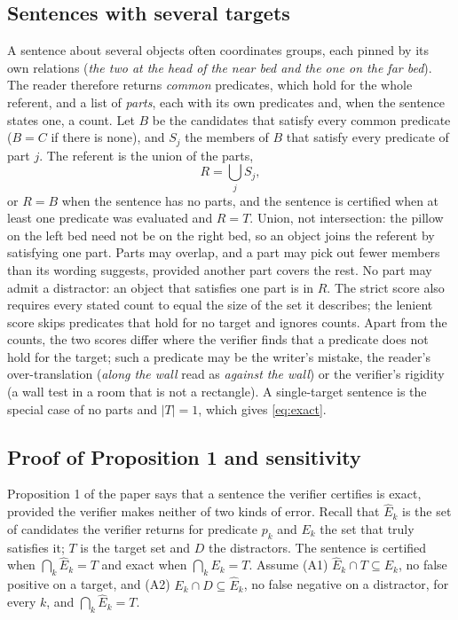 \subsection{Sentences with several targets}
\label{supp:parts}
A sentence about several objects often coordinates groups, each pinned by its own relations (\emph{the two at the head of the near bed and the one on the far bed}).
The reader therefore returns \emph{common} predicates, which hold for the whole referent, and a list of \emph{parts}, each with its own predicates and, when the sentence states one, a count.
Let $B$ be the candidates that satisfy every common predicate ($B = C$ if there is none), and $S_j$ the members of $B$ that satisfy every predicate of part $j$.
The referent is the union of the parts,
\begin{equation}
  R = \bigcup_j S_j ,
  \label{eq:parts}
\end{equation}
or $R = B$ when the sentence has no parts, and the sentence is certified when at least one predicate was evaluated and $R = T$.
Union, not intersection: the pillow on the left bed need not be on the right bed, so an object joins the referent by satisfying one part.
Parts may overlap, and a part may pick out fewer members than its wording suggests, provided another part covers the rest.
No part may admit a distractor: an object that satisfies one part is in $R$.
The strict score also requires every stated count to equal the size of the set it describes; the lenient score skips predicates that hold for no target and ignores counts.
Apart from the counts, the two scores differ where the verifier finds that a predicate does not hold for the target; such a predicate may be the writer's mistake, the reader's over-translation (\emph{along the wall} read as \emph{against the wall}) or the verifier's rigidity (a wall test in a room that is not a rectangle).
A single-target sentence is the special case of no parts and $|T| = 1$, which gives \cref{eq:exact}.

\subsection{Proof of Proposition 1 and sensitivity}
\label{supp:proof}
Proposition 1 of the paper says that a sentence the verifier certifies is exact, provided the verifier makes neither of two kinds of error.
Recall that $\hat{E}_k$ is the set of candidates the verifier returns for predicate $p_k$ and $E_k$ the set that truly satisfies it; $T$ is the target set and $D$ the distractors.
The sentence is certified when $\bigcap_k \hat{E}_k = T$ and exact when $\bigcap_k E_k = T$.
Assume (A1) $\hat{E}_k \cap T \subseteq E_k$, no false positive on a target, and (A2) $E_k \cap D \subseteq \hat{E}_k$, no false negative on a distractor, for every $k$, and $\bigcap_k \hat{E}_k = T$.

